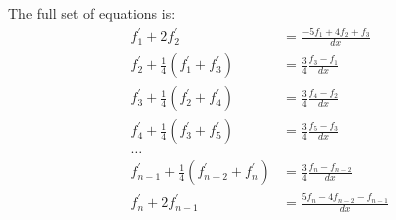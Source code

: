 \documentclass[10pt]{beamer}
\begin{document}
\begin{frame}
\footnotesize
The full set of equations is:
\begin{align*}
    f^{\prime}_1 + 2f^{\prime}_2 &= \frac{-5f_1 + 4f_2 + f_3}{dx} \\
    f_2^{\prime} + \frac{1}{4}(f^{\prime}_{1} + f^{\prime}_{3}) &=
        \frac{3}{4}\frac{f_{3} - f_{1}}{dx} \\
    f_3^{\prime} + \frac{1}{4}(f^{\prime}_{2} + f^{\prime}_{4}) &=
        \frac{3}{4}\frac{f_{4} - f_{2}}{dx} \\
    f_4^{\prime} + \frac{1}{4}(f^{\prime}_{3} + f^{\prime}_{5}) &=
        \frac{3}{4}\frac{f_{5} - f_{3}}{dx} \\
    \hdots& \\
    f_{n-1}^{\prime} + \frac{1}{4}(f^{\prime}_{n-2} + f^{\prime}_{n}) &=
        \frac{3}{4}\frac{f_{n} - f_{n-2}}{dx} \\
    f^{\prime}_{n} + 2f^{\prime}_{n-1} &=
        \frac{5f_{n} - 4f_{n-2} -  f_{n-1}}{dx}
\end{align*}
\end{frame}
\end{document}
